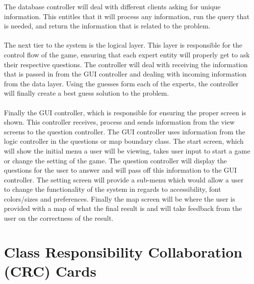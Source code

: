 \documentclass[titlepage]{article}
\begin{document}
The database controller will deal with different clients asking for unique information. This entitles that it will process any information, run the query that is needed, and return the information that is related to the problem. 
\\ \\
The next tier to the system is the logical layer. This layer is responsible for the control flow of the game, ensuring that each expert entity will properly get to ask their respective questions. The controller will deal with receiving the information that is passed in from the GUI controller and dealing with incoming information from the data layer. Using the guesses form each of the experts, the controller will finally create a best guess solution to the problem.
\\ \\
Finally the GUI controller, which is responsible for ensuring the proper screen is shown. This controller receives, process and sends information from the view screens to the question controller. The GUI controller uses information from the logic controller in the questions or map boundary class. The start screen, which will show the initial menu a user will be viewing,  takes user input to start a game or change the setting of the game. The question controller will display the questions for the user to answer and will pass off this information to the GUI controller. The setting screen will provide a sub-menu which would allow a user to change the functionality of the system in regards to accessibility, font colors/sizes and preferences. Finally the map screen will be where the user is provided with a map of what the final result is and will take feedback from the user on the correctness of the result.

	
\newpage	
\section{Class Responsibility Collaboration (CRC) Cards}
\label{sec:class_responsibility_collaboration_crc_cards}
\end{document}
